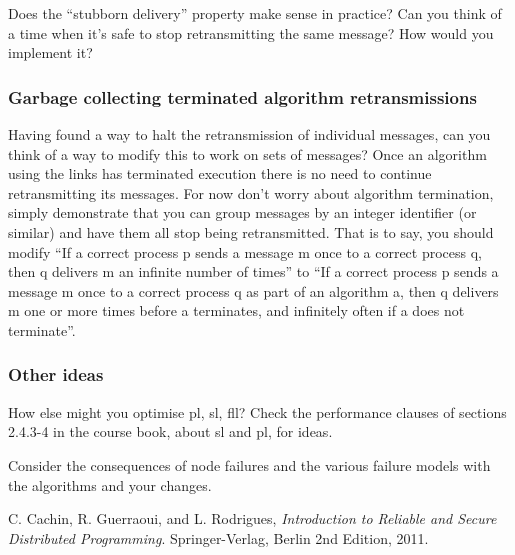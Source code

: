 \documentclass[a4paper]{article}
\begin{document}
Does the ``stubborn delivery'' property make sense in practice? Can you think
of a time when it's safe to stop retransmitting the same message? How would
you implement it?


\subsubsection{Garbage collecting terminated algorithm retransmissions} %
\label{ssub:halting_retransmission_on_algorithm_termination}

Having found a way to halt the retransmission of individual messages, can you
think of a way to modify this to work on sets of messages? Once an algorithm
using the links has terminated execution there is no need to continue
retransmitting its messages. For now don't worry about algorithm termination,
simply demonstrate that you can group messages by an integer identifier (or
similar) and have them all stop being retransmitted. That is to say, you
should modify ``If a correct process p sends a message m once to a correct
process q, then q delivers m an infinite number of times'' to ``If a correct
process p sends a message m once to a correct process q as part of an
algorithm a, then q delivers m one or more times before a terminates, and
infinitely often if a does not terminate''.


\subsubsection{Other ideas} %
\label{ssub:other_ideas}

How else might you optimise pl, sl, fll? Check the performance clauses of
sections 2.4.3-4 in the course book, about sl and pl, for ideas.

Consider the consequences of node failures and the various failure models
with the algorithms and your changes.










\begin{thebibliography}{9}

  C. Cachin, R. Guerraoui, and L. Rodrigues,
  \emph{Introduction to Reliable and Secure Distributed Programming}.
  Springer-Verlag, Berlin
  2nd Edition,
  2011.

\end{thebibliography}
\end{document}
